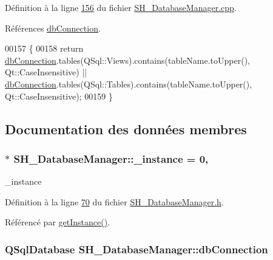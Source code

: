 Définition à la ligne \hyperlink{SH__DatabaseManager_8cpp_source_l00156}{156} du fichier \hyperlink{SH__DatabaseManager_8cpp_source}{S\-H\-\_\-\-Database\-Manager.\-cpp}.



Références \hyperlink{classSH__DatabaseManager_a9291f61c3abbba2c4f1567b1d8325f0e}{db\-Connection}.


\begin{DoxyCode}
00157 \{
00158     \textcolor{keywordflow}{return} \hyperlink{classSH__DatabaseManager_a9291f61c3abbba2c4f1567b1d8325f0e}{dbConnection}.tables(QSql::Views).contains(tableName.toUpper(), Qt::CaseInsensitive) 
      || \hyperlink{classSH__DatabaseManager_a9291f61c3abbba2c4f1567b1d8325f0e}{dbConnection}.tables(QSql::Tables).contains(tableName.toUpper(), Qt::CaseInsensitive);
00159 \}
\end{DoxyCode}


\subsection{Documentation des données membres}
\hypertarget{classSH__DatabaseManager_a8ca37d0cafa6a181582d60e045a8d5ab}{
\subsubsection[{\-\_\-instance}]{ $\ast$ S\-H\-\_\-\-Database\-Manager\-::\-\_\-instance = 0\hspace{0.3cm}{\ttfamily [static]}, {\ttfamily [private]}}}\label{classSH__DatabaseManager_a8ca37d0cafa6a181582d60e045a8d5ab}


\-\_\-instance 



Définition à la ligne \hyperlink{SH__DatabaseManager_8h_source_l00070}{70} du fichier \hyperlink{SH__DatabaseManager_8h_source}{S\-H\-\_\-\-Database\-Manager.\-h}.



Référencé par \hyperlink{classSH__DatabaseManager_a31198eb4de0f8b18e3fa0eed09f24d19}{get\-Instance()}.

\hypertarget{classSH__DatabaseManager_a9291f61c3abbba2c4f1567b1d8325f0e}{
\subsubsection[{db\-Connection}]{\setlength{\rightskip}{0pt plus 5cm}Q\-Sql\-Database S\-H\-\_\-\-Database\-Manager\-::db\-Connection\hspace{0.3cm}{\ttfamily [protected]}}}\label{classSH__DatabaseManager_a9291f61c3abbba2c4f1567b1d8325f0e}


